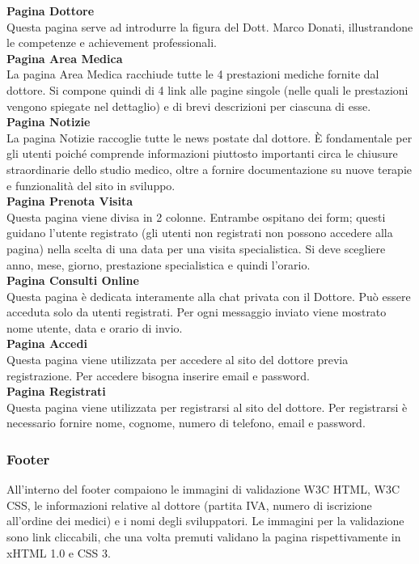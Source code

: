 \textbf{Pagina Dottore} \\
Questa pagina serve ad introdurre la figura del Dott. Marco Donati, illustrandone le competenze e achievement professionali. \\

\textbf{Pagina Area Medica} \\
La pagina Area Medica racchiude tutte le 4 prestazioni mediche fornite dal dottore. Si compone quindi di 4 link alle pagine singole (nelle quali le prestazioni vengono spiegate nel dettaglio) e di brevi descrizioni per ciascuna di esse. \\

\textbf{Pagina Notizie} \\
La pagina Notizie raccoglie tutte le news postate dal dottore. È fondamentale per gli utenti poiché comprende informazioni piuttosto importanti circa le chiusure straordinarie dello studio medico, oltre a fornire documentazione su nuove terapie e funzionalità del sito in sviluppo. \\

\textbf{Pagina Prenota Visita} \\
Questa pagina viene divisa in 2 colonne. Entrambe ospitano dei form;
questi guidano l’utente registrato (gli utenti non registrati non possono accedere alla pagina) nella scelta di una data per una visita specialistica.
Si deve scegliere anno, mese, giorno, prestazione specialistica e quindi l’orario. \\

\textbf{Pagina Consulti Online} \\
Questa pagina è dedicata interamente alla chat privata con il Dottore.
Può essere acceduta solo da utenti registrati.
Per ogni messaggio inviato viene mostrato nome utente, data e orario di invio. \\

\textbf{Pagina Accedi} \\
Questa pagina viene utilizzata per accedere al sito del dottore previa registrazione. Per accedere bisogna inserire email e password. \\

\textbf{Pagina Registrati} \\
Questa pagina viene utilizzata per registrarsi al sito del dottore.  Per registrarsi è necessario fornire nome, cognome, numero di telefono, email e password. \\


\subsubsection{Footer}
All’interno del footer compaiono le immagini di validazione W3C HTML, W3C CSS, le informazioni relative al dottore (partita IVA, numero di iscrizione all’ordine dei medici) e i nomi degli sviluppatori. Le immagini per la validazione sono link cliccabili, che una volta premuti validano la pagina rispettivamente in xHTML 1.0 e CSS 3.


